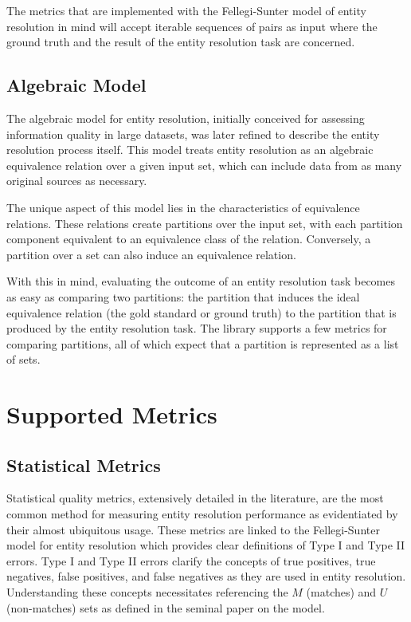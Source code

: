 \documentclass[11pt]{article}
\begin{document}
    The metrics that are implemented with the Fellegi-Sunter model of entity
    resolution in mind will accept iterable sequences of pairs as input where
    the ground truth and the result of the entity resolution task are concerned.

    \subsection{Algebraic Model}
    The algebraic model for entity resolution, initially conceived for assessing
    information quality in large datasets\cite{tal2007algebraic}, was later
    refined to describe the entity resolution process itself\cite{Tal11}.
    This model treats entity resolution as an algebraic equivalence relation
    over a given input set, which can include data from as many original sources
    as necessary.
    
    The unique aspect of this model lies in the characteristics of equivalence
    relations\cite{halmos1960naive}.
    These relations create partitions over the input set, with each partition
    component equivalent to an equivalence class of the relation\cite{Tal11}.
    Conversely, a partition over a set can also induce an equivalence relation.

    With this in mind, evaluating the outcome of an entity resolution task
    becomes as easy as comparing two partitions: the partition that induces the
    ideal equivalence relation (the gold standard or ground truth) to the
    partition that is produced by the entity resolution task.
    The library supports a few metrics for comparing partitions, all of which
    expect that a partition is represented as a list of sets.

    \section{Supported Metrics}\label{sec:metrics}
    
    \subsection{Statistical Metrics}
    Statistical quality metrics, extensively detailed in the
    literature\cite{manning2008,hitesh2012}, are the most common method for
    measuring entity resolution performance as evidentiated by their almost
    ubiquitous usage\cite{fever2009,Goga2015,deepm2020,eager2021}.
    These metrics are linked to the Fellegi-Sunter model for entity resolution
    which provides clear definitions of Type I and Type II
    errors\cite{winkler1990}.
    Type I and Type II errors clarify the concepts of true positives, true
    negatives, false positives, and false negatives as they are used in entity
    resolution.
    Understanding these concepts necessitates referencing the $M$ (matches) and
    $U$ (non-matches) sets as defined in the seminal paper on the model.
\end{document}
